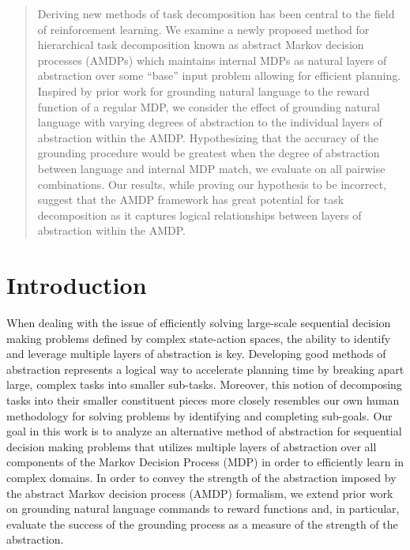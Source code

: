 \documentclass[conference]{IEEEtran}
\begin{document}
\maketitle

\begin{abstract}
Deriving new methods of task decomposition has been central to the field of reinforcement learning. We examine a newly proposed method for hierarchical task decomposition known as abstract Markov decision processes (AMDPs) which maintains internal MDPs as natural layers of abstraction over some ``base'' input problem allowing for efficient planning. Inspired by prior work for grounding natural language to the reward function of a regular MDP, we consider the effect of grounding natural language with varying degrees of abstraction to the individual layers of abstraction within the AMDP. Hypothesizing that the accuracy of the grounding procedure would be greatest when the degree of abstraction between language and internal MDP match, we evaluate on all pairwise combinations. Our results, while proving our hypothesis to be incorrect, suggest that the AMDP framework has great potential for task decomposition as it captures logical relationships between layers of abstraction within the AMDP.
\end{abstract}

\IEEEpeerreviewmaketitle

\section{Introduction}
When dealing with the issue of efficiently solving large-scale sequential decision making problems defined by complex state-action spaces, the ability to identify and leverage multiple layers of abstraction is key. Developing good methods of abstraction represents a logical way to accelerate planning time by breaking apart large, complex tasks into smaller sub-tasks. Moreover, this notion of decomposing tasks into their smaller constituent pieces more closely resembles our own human methodology for solving problems by identifying and completing sub-goals. Our goal in this work is to analyze an alternative method of abstraction for sequential decision making problems that utilizes multiple layers of abstraction over all components of the Markov Decision Process (MDP) in order to efficiently learn in complex domains. In order to convey the strength of the abstraction imposed by the abstract Markov decision process (AMDP) formalism, we extend prior work on grounding natural language commands to reward functions and, in particular, evaluate the success of the grounding process as a measure of the strength of the abstraction.
\end{document}
